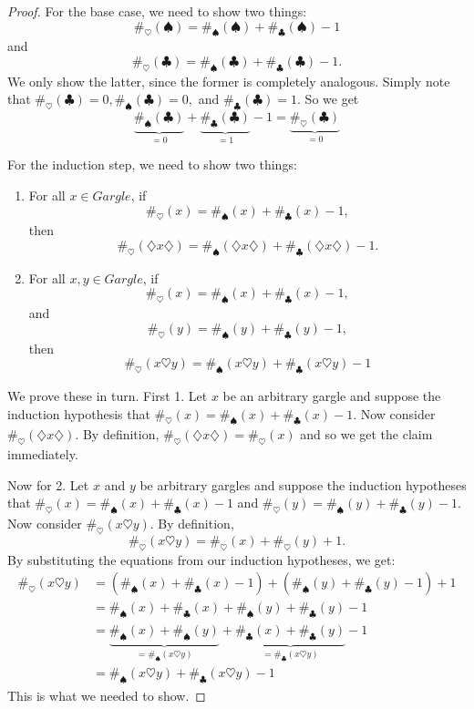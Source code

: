 \begin{enumerate}[{\thesection}.1]
\begin{proof}
			For the base case, we need to show two things: \[\#_\heartsuit(\spadesuit)=\#_\spadesuit(\spadesuit)+\#_\clubsuit(\spadesuit)-1\] and \[\#_\heartsuit(\clubsuit)=\#_\spadesuit(\clubsuit)+\#_\clubsuit(\clubsuit)-1.\] We only show the latter, since the former is completely analogous. Simply note that $\#_\heartsuit(\clubsuit)=0,\#_\spadesuit(\clubsuit)=0,$ and $\#_\clubsuit(\clubsuit)=1$. So we get \[\underbrace{\#_\spadesuit(\clubsuit)}_{=0}+\underbrace{\#_\clubsuit(\clubsuit)}_{=1}-1=\underbrace{\#_\heartsuit(\clubsuit)}_{=0}\]
			
			For the induction step, we need to show two things:
			
			\begin{enumerate}[1.]
			
				\item For all $x\in Gargle$, if \[\#_\heartsuit(x)=\#_\spadesuit(x)+\#_\clubsuit(x)-1,\] then \[\#_\heartsuit(\diamondsuit x\diamondsuit )=\#_\spadesuit(\diamondsuit x\diamondsuit )+\#_\clubsuit(\diamondsuit x\diamondsuit )-1.\]
				
				\item For all $x,y\in Gargle$, if \[\#_\heartsuit(x)=\#_\spadesuit(x)+\#_\clubsuit(x)-1,\] and 
				 \[\#_\heartsuit(y)=\#_\spadesuit(y)+\#_\clubsuit(y)-1,\] then \[\#_\heartsuit(x\heartsuit y )=\#_\spadesuit(x\heartsuit y )+\#_\clubsuit(x\heartsuit y )-1\]
			
			\end{enumerate}
			We prove these in turn. First 1. Let $x$ be an arbitrary gargle and suppose the induction hypothesis that $\#_\heartsuit(x)=\#_\spadesuit(x)+\#_\clubsuit(x)-1$. Now consider $\#_\heartsuit(\diamondsuit x\diamondsuit)$. By definition, $\#_\heartsuit(\diamondsuit x\diamondsuit)=\#_\heartsuit(x)$ and so we get the claim immediately.
			
			Now for 2. Let $x$ and $y$ be arbitrary gargles and suppose the induction hypotheses that $\#_\heartsuit(x)=\#_\spadesuit(x)+\#_\clubsuit(x)-1$ and $\#_\heartsuit(y)=\#_\spadesuit(y)+\#_\clubsuit(y)-1$. Now consider $\#_\heartsuit(x\heartsuit y)$. By definition, \[\#_\heartsuit(x\heartsuit y)=\#_\heartsuit(x)+\#_\heartsuit(y)+1.\] By substituting the equations from our induction hypotheses, we get:
			\begin{align*}\#_\heartsuit(x\heartsuit y)&=(\#_\spadesuit(x)+\#_\clubsuit(x)-1)+(\#_\spadesuit(y)+\#_\clubsuit(y)-1)+1\\
			&=\#_\spadesuit(x)+\#_\clubsuit(x)+\#_\spadesuit(y)+\#_\clubsuit(y)-1\\
			&=\underbrace{\#_\spadesuit(x)+\#_\spadesuit(y)}_{=\#_\spadesuit(x\heartsuit y)}+\underbrace{\#_\clubsuit(x)+\#_\clubsuit(y)}_{=\#_\clubsuit(x\heartsuit y)}-1\\
			&=\#_\spadesuit(x\heartsuit y )+\#_\clubsuit(x\heartsuit y )-1
			\end{align*}
			This is what we needed to show.
			

\end{proof}
\end{enumerate}

